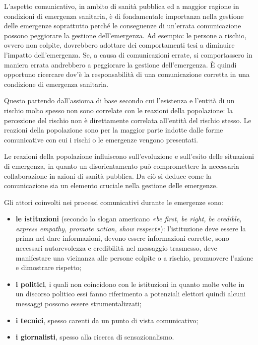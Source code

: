 L'aspetto comunicativo, in ambito di sanità pubblica ed a maggior
ragione in condizioni di emergenza sanitaria, è di fondamentale
importanza nella gestione delle emergenze soprattutto perché le
conseguenze di un'errata comunicazione possono peggiorare la gestione
dell'emergenza. Ad esempio: le persone a rischio, ovvero non colpite,
dovrebbero adottare dei comportamenti tesi a diminuire l'impatto
dell'emergenza. Se, a causa di comunicazioni errate, si comportassero in
maniera errata andrebbero a peggiorare la gestione dell'emergenza. È
quindi opportuno ricercare dov'è la responsabilità di una comunicazione
corretta in una condizione di emergenza sanitaria.

Questo partendo dall'assioma di base secondo cui l'esistenza e l'entità
di un rischio molto spesso non sono correlate con le reazioni della
popolazione: la percezione del rischio non è direttamente correlata
all'entità del rischio stesso. Le reazioni della popolazione sono per la
maggior parte indotte dalle forme comunicative con cui i rischi o le
emergenze vengono presentati.

Le reazioni della popolazione influiscono sull'evoluzione e sull'esito
delle situazioni di emergenza, in quanto un disorientamento può
compromettere la necessaria collaborazione in azioni di sanità pubblica.
Da ciò si deduce come la comunicazione sia un elemento cruciale nella
gestione delle emergenze.

Gli attori coinvolti nei processi comunicativi durante le emergenze
sono:

\begin{itemize}
\item
  \textbf{le istituzioni} (secondo lo slogan americano \emph{«be first,
  be right, be credible, express empathy, promote action, show
  respect»}): l'istituzione deve essere la prima nel dare informazioni,
  devono essere informazioni corrette, sono necessari autorevolezza e
  credibilità nel messaggio trasmesso, deve manifestare una vicinanza
  alle persone colpite o a rischio, promuovere l'azione e dimostrare
  rispetto;
\item
  \textbf{i politici}, i quali non coincidono con le istituzioni in
  quanto molte volte in un discorso politico essi fanno riferimento a
  potenziali elettori quindi alcuni messaggi possono essere
  strumentalizzati;
\item
  \textbf{i tecnici}, spesso carenti da un punto di vista comunicativo;
\item
  \textbf{i giornalisti}, spesso alla ricerca di sensazionalismo.
\end{itemize}

